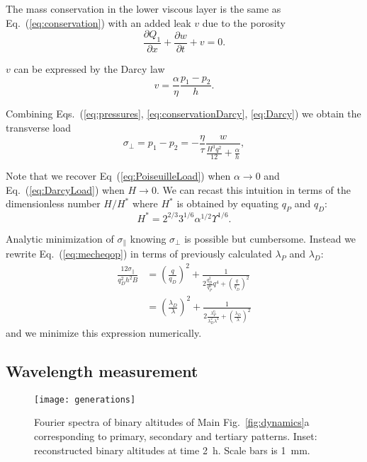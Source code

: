 \documentclass[twocolumn,superscriptaddress,showpacs,preprintnumbers,
amsmath,amssymb,prl]{revtex4-1}
\begin{document}
The mass conservation in the lower viscous layer is the same as Eq.~(\ref{eq:conservation}) with an added leak $v$ due to the porosity
\begin{equation}
\frac{\partial Q_1}{\partial x} + \frac{\partial w}{\partial t} + v = 0.
\label{eq:conservationDarcy}
\end{equation}

$v$ can be expressed by the Darcy law
\begin{equation}
v = \frac{\alpha}{\eta} \frac{p_1-p_2}{h}.
\label{eq:Darcy}
\end{equation}

Combining Eqs.~(\ref{eq:pressures}, \ref{eq:conservationDarcy}, \ref{eq:Darcy}) we obtain the transverse load
\begin{equation}
\sigma_\perp = p_1-p_2 = - \frac{\eta}{\tau} \frac{w}{\frac{H^3 q^2}{12} + \frac{\alpha}{h}},
\label{eq:MixtLoad}
\end{equation}

Note that we recover Eq~(\ref{eq:PoiseuilleLoad}) when $\alpha \rightarrow 0$ and Eq.~(\ref{eq:DarcyLoad}) when $H \rightarrow 0$. We can recast this intuition in terms of the dimensionless number $H/H^*$ where $H^*$ is obtained by equating $q_P$ and $q_D$:
\begin{equation}
H^* = 2^{2/3} 3^{1/6} \alpha^{1/2} \Upsilon^{1/6}.
\end{equation}

Analytic minimization of $\sigma_\parallel$ knowing $\sigma_\perp$ is possible but cumbersome. Instead we rewrite Eq.~(\ref{eq:mecheqop}) in terms of previously calculated $\lambda_P$ and $\lambda_D$:
\begin{align}
\frac{12\sigma_\parallel}{q_D^2 h^2 B} &= \left(\frac{q}{q_D}\right)^2 + \frac{1}{2\frac{q_D^2}{q_P^6}q^4  + \left(\frac{q}{q_D}\right)^2}\\
&= \left(\frac{\lambda_D}{\lambda}\right)^2 + \frac{1}{2\frac{\lambda_P^6}{\lambda_D^2\lambda^4}  + \left(\frac{\lambda_D}{\lambda}\right)^2}
\end{align}
and we minimize this expression numerically.

\subsection*{Wavelength measurement}

\begin{figure}
	\texttt{[image: generations]}%
	\caption{Fourier spectra of binary altitudes of Main Fig.~\ref{fig:dynamics}a corresponding to primary, secondary and tertiary patterns. Inset: reconstructed binary altitudes at time \SI{2}{\hour}. Scale bars is \SI{1}{\milli\metre}.}%
	\label{fig:generations}%
\end{figure}
\end{document}
